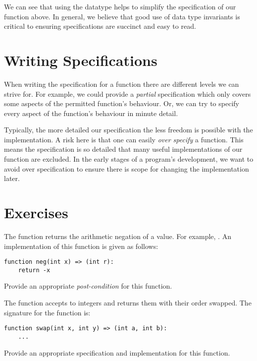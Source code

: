 We can see that using the  datatype helps to simplify the specification of our  function above.  In general, we believe that good use of data type invariants is critical to ensuring specifications are succinct and easy to read.

\section{Writing Specifications}

When writing the specification for a function there are different levels we can strive for.  For example, we could provide a {\em partial} specification which only covers some aspects of the permitted function's behaviour.  Or, we can try to specify every aspect of the function's behaviour in minute detail.  

Typically, the more detailed our specification the less freedom is possible with the implementation.  A risk here is that one can easily {\em over specify} a function.  This means the specification is so detailed that many useful implementations of our function are excluded.  In the early stages of a program's development, we want to avoid over specification to ensure there is scope for changing the implementation later.  


\section*{Exercises}

\begin{ex}
The function  returns the arithmetic negation of a value.
For example, .  An implementation of
this function is given as follows:
\begin{lstlisting}
function neg(int x) => (int r):
    return -x
\end{lstlisting}
Provide an appropriate {\em post-condition} for this function.
\end{ex}

\begin{ex}
The  function accepts to integers and returns them
with their order swapped.  The signature for the function is:
\begin{lstlisting}
function swap(int x, int y) => (int a, int b):
    ...
\end{lstlisting}
Provide an appropriate specification and implementation for this function.
\end{ex}

